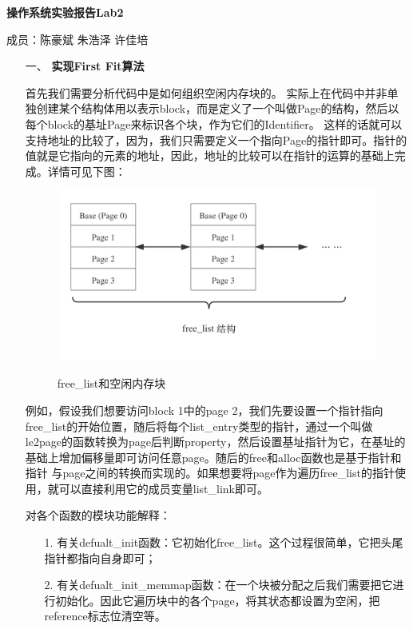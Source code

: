 \documentclass[UTF8, a4paper]{ctexart}
\begin{document}
\centerline{\textbf{\LARGE{操作系统实验报告Lab2}}}
\bigskip
\centerline{\large{成员：陈豪斌 \quad 朱浩泽 \quad 许佳培}}

\begin{enumerate}
    \item [一、] \textbf{实现First Fit算法}
    \par
    首先我们需要分析代码中是如何组织空闲内存块的。
    实际上在代码中并非单独创建某个结构体用以表示block，而是定义了一个叫做Page的结构，然后以每个block的基址Page来标识各个块，作为它们的Identifier。
    这样的话就可以支持地址的比较了，因为，我们只需要定义一个指向Page的指针即可。指针的值就是它指向的元素的地址，因此，地址的比较可以在指针的运算的基础上完成。详情可见下图：
    \begin{figure}[!htb]
        \centering
        \includegraphics[scale=0.25]{freelist.png}
        \label{fig:1}
        \caption{free\_list和空闲内存块}
    \end{figure}
    \par
    例如，假设我们想要访问block 1中的page 2，我们先要设置一个指针指向free\_list的开始位置，随后将每个list\_entry类型的指针，通过一个叫做
    le2page的函数转换为page后判断property，然后设置基址指针为它，在基址的基础上增加偏移量即可访问任意page。随后的free和alloc函数也是基于指针和指针
    与page之间的转换而实现的。如果想要将page作为遍历free\_list的指针使用，就可以直接利用它的成员变量list\_link即可。
    \par
    对各个函数的模块功能解释：
    \begin{enumerate}
        \item [1.] 有关defualt\_init函数：它初始化free\_list。这个过程很简单，它把头尾指针都指向自身即可；
        \item [2.] 有关defualt\_init\_memmap函数：在一个块被分配之后我们需要把它进行初始化。因此它遍历块中的各个page，将其状态都设置为空闲，把reference标志位清空等。

\end{enumerate}
\end{enumerate}
\end{document}
